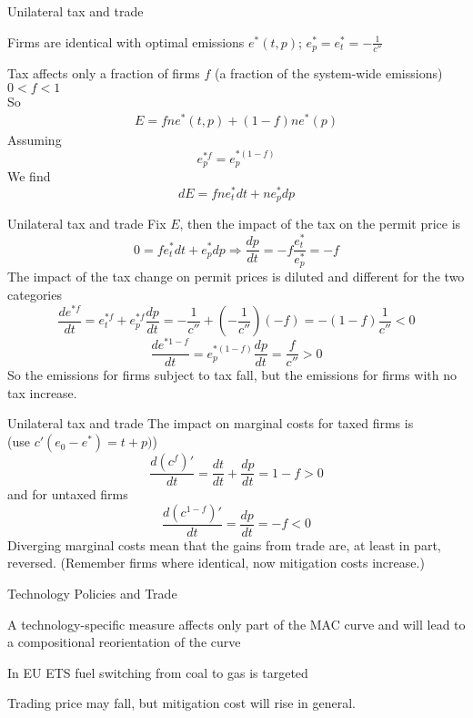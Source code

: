 {Unilateral tax and trade}
\item <1-> Firms are identical with optimal emissions $e^*(t,p)$; $e^*_p = e^*_t = -\frac{1}{c''}$
\item <2-> Tax affects only a fraction of firms $f$ (a fraction of the system-wide emissions) $0 < f < 1$ \\
 So
\begin{align}
E = fne^*(t,p)+(1-f)ne^*(p)
\end{align}
Assuming
\[
e^{*f}_p = e^{*(1-f)}_p
\]
We find
\[
dE = fne^*_tdt+ne^*_pdp
\]


{Unilateral tax and trade}
Fix $E$, then the impact of the tax on the permit price is
\[
0 =  fe^*_tdt+e^*_pdp \Rightarrow \frac{dp}{dt} = -f \frac{e^*_t}{e^*_p} = -f
\]
The impact of the tax change on permit prices is diluted and different for the two categories
\[
\frac{de^{*f}}{dt} = e^{*f}_t + e^{*f}_p \frac{dp}{dt} = -\frac{1}{c''} + (-\frac{1}{c''})(-f) = -(1-f)\frac{1}{c''} < 0
\]
\[
\frac{de^{*1-f}}{dt} = e^{*(1-f)}_p\frac{dp}{dt} = \frac{f}{c''} > 0
\]
So the emissions for firms subject to tax fall, but the emissions for firms with no tax increase.


{Unilateral tax and trade}
The impact on marginal costs for taxed firms is \\
(use $c'(e_0-e^*) = t+p)$)
\[
\frac{d(c^f)'}{dt} = \frac{dt}{dt} + \frac{dp}{dt} = 1-f > 0
\]
and for untaxed firms
\[
\frac{d(c^{1-f})'}{dt} = \frac{dp}{dt} = -f < 0
\]
Diverging marginal costs mean that the gains from trade are, at least in part, reversed. (Remember firms where identical, now mitigation costs increase.)


{Technology Policies and Trade}
\item<1-> A technology-specific measure affects only part of the MAC curve and will lead to a compositional reorientation of the curve
\item<2-> In EU ETS fuel switching from coal to gas is targeted
\item<3-> Trading price may fall, but mitigation cost will rise in general.

